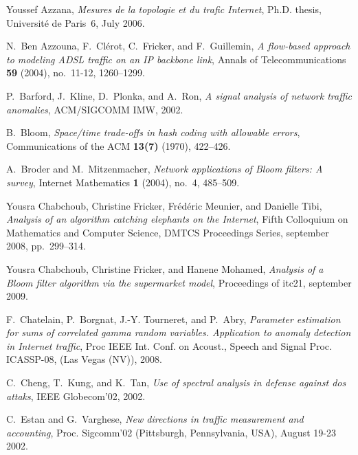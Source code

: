 \documentclass{amsart}
\begin{document}
\providecommand{\bysame}{\leavevmode\hbox to3em{\hrulefill}\thinspace}
\providecommand{\MR}{\relax\ifhmode\unskip\space\fi MR }
\providecommand{\MRhref}[2]{\href{http://www.ams.org/mathscinet-getitem?mr=#1}{#2}
}
\providecommand{\href}[2]{#2}
\begin{thebibliography}{10}

Youssef Azzana, \emph{Mesures de la topologie et du trafic {I}nternet}, Ph.D.
  thesis, Universit\'e de Paris~6, July 2006.

N.~Ben Azzouna, F.~Cl\'erot, C.~Fricker, and F.~Guillemin, \emph{A flow-based
  approach to modeling {ADSL} traffic on an {IP} backbone link}, Annals of
  Telecommunications \textbf{59} (2004), no.~11-12, 1260--1299.

P.~Barford, J.~Kline, D.~Plonka, and A.~Ron, \emph{A signal analysis of network
  traffic anomalies}, ACM/SIGCOMM IMW, 2002.

B.~Bloom, \emph{Space/time trade-offs in hash coding with allowable errors},
  Communications of the ACM \textbf{13(7)} (1970), 422--426.

A.~Broder and M.~Mitzenmacher, \emph{Network applications of {B}loom filters: A
  survey}, Internet Mathematics \textbf{1} (2004), no.~4, 485--509.

Yousra Chabchoub, Christine Fricker, Fr\'ed\'eric Meunier, and Danielle Tibi,
  \emph{Analysis of an algorithm catching elephants on the {I}nternet}, Fifth
  Colloquium on Mathematics and Computer Science, DMTCS Proceedings Series,
  september 2008, pp.~299--314.

Yousra Chabchoub, Christine Fricker, and Hanene Mohamed, \emph{Analysis of a
  {B}loom filter algorithm via the supermarket model}, Proceedings of itc21,
  september 2009.

F.~Chatelain, P.~Borgnat, J.-Y. Tourneret, and P.~Abry, \emph{Parameter
  estimation for sums of correlated gamma random variables. {A}pplication to
  anomaly detection in {I}nternet traffic}, Proc IEEE Int. Conf. on Acoust.,
  Speech and Signal Proc. ICASSP-08, (Las Vegas (NV)), 2008.

C.~Cheng, T.~Kung, and K.~Tan, \emph{Use of spectral analysis in defense
  against dos attaks}, IEEE Globecom'02, 2002.

C.~Estan and G.~Varghese, \emph{New directions in traffic measurement and
  accounting}, Proc. Sigcomm'02 (Pittsburgh, Pennsylvania, USA), August 19-23
  2002.


\end{thebibliography}
\end{document}

